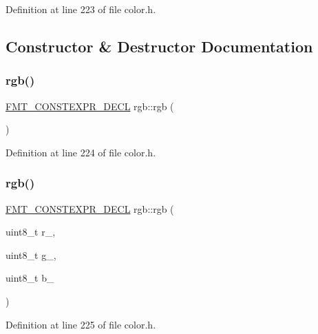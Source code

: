 Definition at line 223 of file color.\+h.



\subsection{Constructor \& Destructor Documentation}
\mbox{\label{structrgb_a45da96e6d5076fa914f230f4258eacf2}} 
\subsubsection{\texorpdfstring{rgb()}{rgb()}\hspace{0.1cm}{\footnotesize\ttfamily [1/4]}}
{\footnotesize\ttfamily \hyperlink{core_8h_af4388801466a5994a363d6005616371a}{F\+M\+T\+\_\+\+C\+O\+N\+S\+T\+E\+X\+P\+R\+\_\+\+D\+E\+CL} rgb\+::rgb (\begin{DoxyParamCaption}{ }\end{DoxyParamCaption})\hspace{0.3cm}{\ttfamily [inline]}}



Definition at line 224 of file color.\+h.

\mbox{\label{structrgb_a6a2cb3ed813662a41239b561e240e54b}} 
\subsubsection{\texorpdfstring{rgb()}{rgb()}\hspace{0.1cm}{\footnotesize\ttfamily [2/4]}}
{\footnotesize\ttfamily \hyperlink{core_8h_af4388801466a5994a363d6005616371a}{F\+M\+T\+\_\+\+C\+O\+N\+S\+T\+E\+X\+P\+R\+\_\+\+D\+E\+CL} rgb\+::rgb (\begin{DoxyParamCaption}\item[{uint8\+\_\+t}]{r\+\_\+,  }\item[{uint8\+\_\+t}]{g\+\_\+,  }\item[{uint8\+\_\+t}]{b\+\_\+ }\end{DoxyParamCaption})\hspace{0.3cm}{\ttfamily [inline]}}



Definition at line 225 of file color.\+h.

\mbox{\label{structrgb_a607e4a0987218581bcc680c6822bd35f}} 
